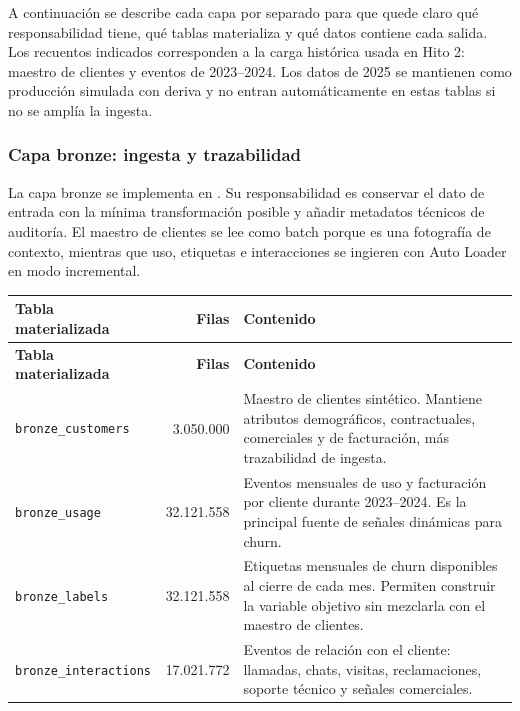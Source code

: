 \documentclass[12pt,a4paper]{article}
\begin{document}
A continuación se describe cada capa por separado para que quede claro qué responsabilidad tiene, qué tablas materializa y qué datos contiene cada salida. Los recuentos indicados corresponden a la carga histórica usada en Hito 2: maestro de clientes y eventos de 2023--2024. Los datos de 2025 se mantienen como producción simulada con deriva y no entran automáticamente en estas tablas si no se amplía la ingesta.

\subsubsection{Capa bronze: ingesta y trazabilidad}

La capa bronze se implementa en . Su responsabilidad es conservar el dato de entrada con la mínima transformación posible y añadir metadatos técnicos de auditoría. El maestro de clientes se lee como batch porque es una fotografía de contexto, mientras que uso, etiquetas e interacciones se ingieren con Auto Loader en modo incremental.

\begin{longtable}{p{4.1cm} r p{8.3cm}}
\toprule
\textbf{Tabla materializada} & \textbf{Filas} & \textbf{Contenido} \\
\midrule
\endfirsthead
\toprule
\textbf{Tabla materializada} & \textbf{Filas} & \textbf{Contenido} \\
\midrule
\endhead
\bottomrule
\endlastfoot
\texttt{bronze\_customers} & 3.050.000 & Maestro de clientes sintético. Mantiene atributos demográficos, contractuales, comerciales y de facturación, más trazabilidad de ingesta. \\[4pt]
\texttt{bronze\_usage} & 32.121.558 & Eventos mensuales de uso y facturación por cliente durante 2023--2024. Es la principal fuente de señales dinámicas para churn. \\[4pt]
\texttt{bronze\_labels} & 32.121.558 & Etiquetas mensuales de churn disponibles al cierre de cada mes. Permiten construir la variable objetivo sin mezclarla con el maestro de clientes. \\[4pt]
\texttt{bronze\_interactions} & 17.021.772 & Eventos de relación con el cliente: llamadas, chats, visitas, reclamaciones, soporte técnico y señales comerciales. \\
\end{longtable}
\end{document}
